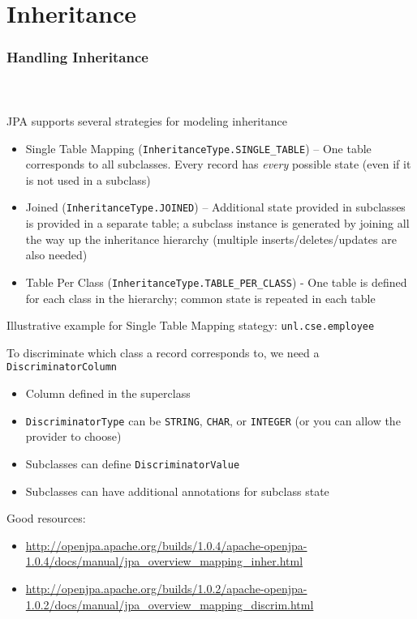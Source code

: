 \documentclass{beamer}
\begin{document}
\section{Inheritance}

\begin{frame}
  \frametitle{Handling Inheritance}
  \framesubtitle{~}

JPA supports several strategies for modeling inheritance
  \begin{itemize}
    \item Single Table Mapping (\lstinline|InheritanceType.SINGLE_TABLE|) -- One table corresponds to all subclasses.  Every record has \emph{every} possible state (even if it is not used in a subclass)
    \item Joined (\lstinline|InheritanceType.JOINED|) -- Additional state provided in subclasses is provided in a separate table; a subclass instance is generated by joining all the way up the inheritance hierarchy (multiple inserts/deletes/updates are also needed)
    \item Table Per Class (\lstinline|InheritanceType.TABLE_PER_CLASS|) - One table is defined for each class in the hierarchy; common state is repeated in each table
  \end{itemize}

\framebreak
Illustrative example for Single Table Mapping stategy: \lstinline|unl.cse.employee|

To discriminate which class a record corresponds to, we need a \lstinline|DiscriminatorColumn|
\begin{itemize}
  \item Column defined in the superclass
  \item \lstinline|DiscriminatorType| can be \lstinline|STRING|, \lstinline|CHAR|, or \lstinline|INTEGER| (or you can allow the provider to choose)
  \item Subclasses can define \lstinline|DiscriminatorValue|
  \item Subclasses can have additional annotations for subclass state
\end{itemize}

\framebreak
Good resources:
  \begin{itemize}
    \item \url{http://openjpa.apache.org/builds/1.0.4/apache-openjpa-1.0.4/docs/manual/jpa_overview_mapping_inher.html}
    \item \url{http://openjpa.apache.org/builds/1.0.2/apache-openjpa-1.0.2/docs/manual/jpa_overview_mapping_discrim.html}
  \end{itemize}

\end{frame}
\end{document}
